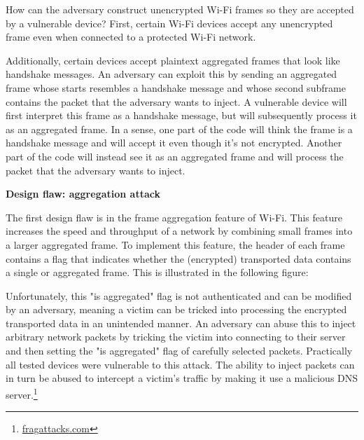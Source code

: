 How can the adversary construct unencrypted Wi-Fi frames so they are accepted by a vulnerable device? First, certain Wi-Fi devices accept any unencrypted frame even when connected to a protected Wi-Fi network.

Additionally, certain devices accept plaintext aggregated frames that look like handshake messages. An adversary can exploit this by sending an aggregated frame whose starts resembles a handshake message and whose second subframe contains the packet that the adversary wants to inject. A vulnerable device will first interpret this frame as a handshake message, but will subsequently process it as an aggregated frame. In a sense, one part of the code will think the frame is a handshake message and will accept it even though it's not encrypted. Another part of the code will instead see it as an aggregated frame and will process the packet that the adversary wants to inject.

\textbf{Design flaw: aggregation attack}

The first design flaw is in the frame aggregation feature of Wi-Fi. This feature increases the speed and throughput of a network by combining small frames into a larger aggregated frame. To implement this feature, the header of each frame contains a flag that indicates whether the (encrypted) transported data contains a single or aggregated frame. This is illustrated in the following figure:

Unfortunately, this "is aggregated" flag is not authenticated and can be modified by an adversary, meaning a victim can be tricked into processing the encrypted transported data in an unintended manner. An adversary can abuse this to inject arbitrary network packets by tricking the victim into connecting to their server and then setting the "is aggregated" flag of carefully selected packets. Practically all tested devices were vulnerable to this attack. The ability to inject packets can in turn be abused to intercept a victim's traffic by making it use a malicious DNS server.\footnote{\href{https://www.fragattacks.com}{fragattacks.com}}